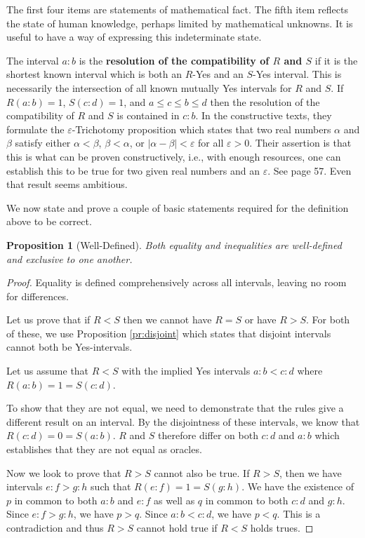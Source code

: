 \documentclass[12pt]{article}
\newtheorem{proposition}{Proposition}[subsection]
\begin{document}
The first four items are statements of mathematical fact. The fifth item reflects the state of human knowledge, perhaps limited by mathematical unknowns. It is useful to have a way of expressing this indeterminate state. 

The interval $a:b$ is the \textbf{resolution of the compatibility of $R$ and $S$} if it is the shortest known interval which is both an $R$-Yes and an $S$-Yes interval. This is necessarily the intersection of all known mutually Yes intervals for $R$ and $S$.  If $R(a:b) = 1$, $S(c:d) = 1$, and $ a \leq c \leq b \leq d$ then the resolution of the compatibility of $R$ and $S$ is contained in $c:b$. In the constructive texts, they formulate the $\varepsilon$-Trichotomy proposition which states that two real numbers $\alpha$ and $\beta$ satisfy either $\alpha < \beta$, $\beta < \alpha$, or $|\alpha - \beta| < \varepsilon$ for all $\varepsilon > 0$. Their assertion is that this is what can be proven constructively, i.e., with enough resources, one can establish this to be true for two given real numbers and an $\varepsilon$. See \cite{bridger} page 57. Even that result seems ambitious. 

We now state and prove a couple of basic statements required for the definition above to be correct. 

\begin{proposition}[Well-Defined]\label{pr:wd}
Both equality and inequalities are well-defined and exclusive to one another.  
\end{proposition}

\begin{proof}
Equality is defined comprehensively across all intervals, leaving no room for differences. 

Let us prove that if $R < S$ then we cannot have $R=S$ or have $R > S$. For both of these, we use Proposition \ref{pr:disjoint} which states that disjoint intervals cannot both be Yes-intervals. 

Let us assume that $R<S$ with the implied Yes intervals $a:b < c:d$ where $R(a:b)=1 =S(c:d)$.

To show that they are not equal, we need to demonstrate that the rules give a different result on an interval. By the disjointness of these intervals, we know that $R(c:d) = 0 = S(a:b)$. $R$ and $S$ therefore differ on both $c:d$ and $a:b$ which establishes that they are not equal as oracles.  

Now we look to prove that $R>S$ cannot also be true. If $R > S$, then we have intervals $e:f > g:h$ such that $R(e:f) = 1 = S(g:h)$. We have the existence of $p$ in common to both $a:b$ and $e:f$ as well as $q$ in common to both $c:d$ and $g:h$. Since $e:f > g:h$, we have $p > q$. Since $a:b < c:d$, we have $p < q$. This is a contradiction and thus $R>S$ cannot hold true if $R<S$ holds trues.
\end{proof}
\end{document}
